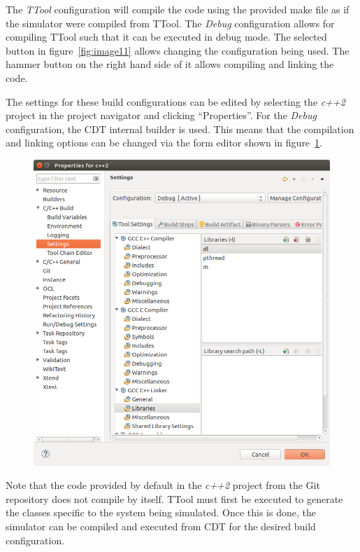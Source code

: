 \documentclass[12pt]{article}
\begin{document}
The \textit{TTool} configuration will compile the code using the provided make
file as if the simulator were compiled from TTool. The \textit{Debug}
configuration allows for compiling TTool such that it can be executed in debug
mode. The selected button in figure~\ref{fig:image11} allows changing the configuration being
used. The hammer button on the right hand side of it allows compiling and
linking the code.

The settings for these build configurations can be edited by selecting the
\textit{c++2} project in the project navigator and clicking
``Properties''. For the \textit{Debug} configuration, the CDT internal builder
is used. This means that the compilation and linking options can be changed via
the form editor shown in figure~\ref{fig:image12}.

\begin{figure}[H]
\begin{center}
\includegraphics[width=\textwidth]{images/image12.png}
\end{center}
\caption{}
\label{fig:image12}
\end{figure}

Note that the code provided by default in the \textit{c++2} project
from the Git repository does not compile by itself. TTool must first be executed
to generate the classes specific to the system being simulated. Once this is
done, the simulator can be compiled and executed from CDT for the desired build
configuration.
\end{document}
